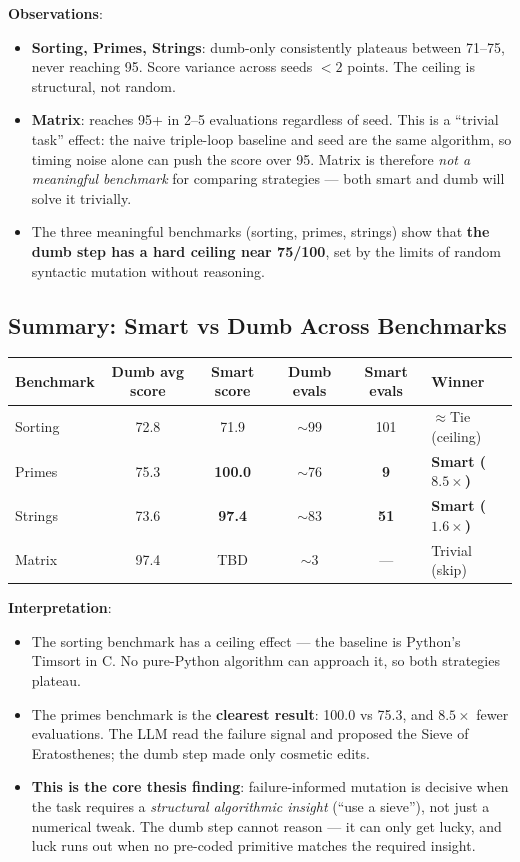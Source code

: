 \documentclass[11pt,a4paper]{article}
\begin{document}
\textbf{Observations}:
\begin{itemize}
  \item \textbf{Sorting, Primes, Strings}: dumb-only consistently plateaus between
    71--75, never reaching 95. Score variance across seeds $< 2$ points. The
    ceiling is structural, not random.
  \item \textbf{Matrix}: reaches 95+ in 2--5 evaluations regardless of seed.
    This is a ``trivial task'' effect: the naive triple-loop baseline and seed
    are the same algorithm, so timing noise alone can push the score over 95.
    Matrix is therefore \emph{not a meaningful benchmark} for comparing
    strategies — both smart and dumb will solve it trivially.
  \item The three meaningful benchmarks (sorting, primes, strings) show
    that \textbf{the dumb step has a hard ceiling near 75/100}, set by the
    limits of random syntactic mutation without reasoning.
\end{itemize}

\subsection{Summary: Smart vs Dumb Across Benchmarks}

\begin{center}
\begin{tabular}{lccccl}
\toprule
\textbf{Benchmark} & \textbf{Dumb avg score} & \textbf{Smart score} & \textbf{Dumb evals} & \textbf{Smart evals} & \textbf{Winner} \\
\midrule
Sorting  & 72.8 & 71.9 & $\sim$99 & 101 & $\approx$Tie (ceiling) \\
Primes   & 75.3 & \textbf{100.0} & $\sim$76 & \textbf{9}  & \textbf{Smart ($8.5\times$)} \\
Strings  & 73.6 & \textbf{97.4} & $\sim$83 & \textbf{51} & \textbf{Smart ($1.6\times$)} \\
Matrix   & 97.4 & TBD & $\sim$3  & — & Trivial (skip) \\
\bottomrule
\end{tabular}
\end{center}

\textbf{Interpretation}:
\begin{itemize}
  \item The sorting benchmark has a ceiling effect — the baseline is Python's
    Timsort in C. No pure-Python algorithm can approach it, so both strategies plateau.
  \item The primes benchmark is the \textbf{clearest result}: 100.0 vs 75.3,
    and $8.5\times$ fewer evaluations. The LLM read the failure signal and
    proposed the Sieve of Eratosthenes; the dumb step made only cosmetic edits.
  \item \textbf{This is the core thesis finding}: failure-informed mutation
    is decisive when the task requires a \emph{structural algorithmic insight}
    (``use a sieve''), not just a numerical tweak. The dumb step cannot reason —
    it can only get lucky, and luck runs out when no pre-coded primitive matches
    the required insight.
\end{itemize}
\end{document}
